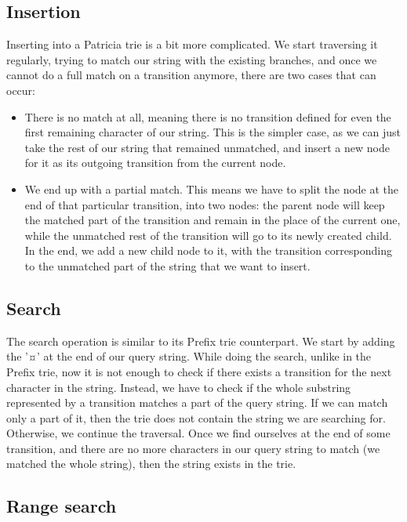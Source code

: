 \documentclass[essay]{fer}
\begin{document}
\subsection{Insertion}

Inserting into a Patricia trie is a bit more complicated. We start traversing it regularly, trying to match our string with the existing branches, and once we cannot do a full match on a transition anymore, there are two cases that can occur:
\begin{itemize}
    \item There is no match at all, meaning there is no transition defined for even the first remaining character of our string. This is the simpler case, as we can just take the rest of our string that remained unmatched, and insert a new node for it as its outgoing transition from the current node.
    \item We end up with a partial match. This means we have to split the node at the end of that particular transition, into two nodes: the parent node will keep the matched part of the transition and remain in the place of the current one, while the unmatched rest of the transition will go to its newly created child. In the end, we add a new child node to it, with the transition corresponding to the unmatched part of the string that we want to insert.
\end{itemize}

\subsection{Search}

The search operation is similar to its Prefix trie counterpart. We start by adding the '¤' at the end of our query string. While doing the search, unlike in the Prefix trie, now it is not enough to check if there exists a transition for the next character in the string. Instead, we have to check if the whole substring represented by a transition matches a part of the query string. If we can match only a part of it, then the trie does not contain the string we are searching for. Otherwise, we continue the traversal. Once we find ourselves at the end of some transition, and there are no more characters in our query string to match (we matched the whole string), then the string exists in the trie.

\subsection{Range search}
\end{document}
